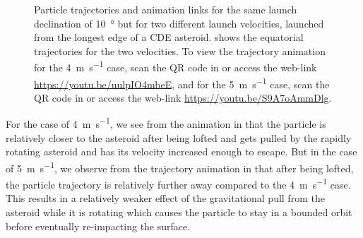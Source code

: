 \begin{figure}[htb]
\qquad
{}
\caption{Particle trajectories and animation links for the same launch declination of \SI{10}{\degree} but for two different launch velocities, launched from the longest edge of a \gls{CDE} asteroid. \protect{} shows the equatorial trajectories for the two velocities. To view the trajectory animation for the \SI{4}{\metre\per\second} case, scan the QR code in \protect{} or access the web-link \protect\url{https://youtu.be/uulpIO4mbeE}, and for the \SI{5}{\metre\per\second} case, scan the QR code in \protect{} or access the web-link \protect\url{https://youtu.be/S9A7oAmmDlg}.}
\label{fig:non_conservative_10Decl_4and5_launchVel}
\end{figure}
\FloatBarrier
For the case of \SI{4}{\metre\per\second}, we see from the animation in  that the particle is relatively closer to the asteroid after being lofted and gets pulled by the rapidly rotating asteroid and has its velocity increased enough to escape. But in the case of \SI{5}{\metre\per\second}, we observe from the trajectory animation in  that after being lofted, the particle trajectory is relatively further away compared to the \SI{4}{\metre\per\second} case. This results in a relatively weaker effect of the gravitational pull from the asteroid while it is rotating which causes the particle to stay in a bounded orbit before eventually re-impacting the surface.
%
\newline\newline
